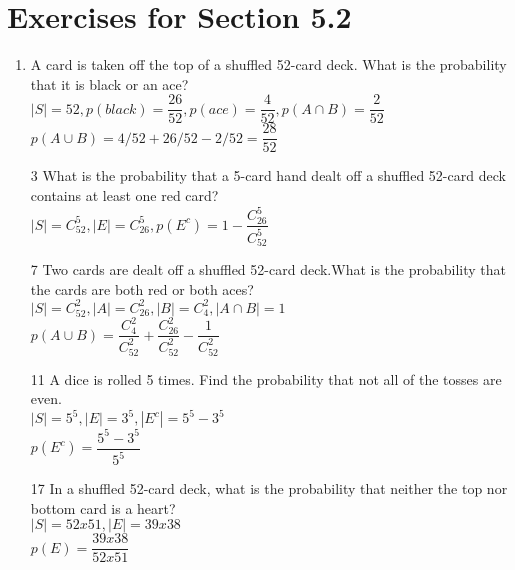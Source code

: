 \documentclass[12pt]{article}
\begin{document}
\section*{Exercises for Section 5.2}
\begin{enumerate}
    \item A card is taken off the top of a shuffled 52-card deck. What is the probability that it is black or an ace?\\
	$|S| = 52, p(black) = \dfrac{26}{52}, p(ace)=\dfrac{4}{52}, p(A\cap B) = \dfrac{2}{52}$\\
	$p(A\cup B) =  4/52 + 26/52 - 2/52 = \dfrac{28}{52}$
    \item [3] What is the probability that a 5-card hand dealt off a shuffled 52-card deck contains at least one red card?\\
	$|S| = C_{52}^5, |E| = C_{26}^{5}, p(E^c) = 1 - \dfrac{C_{26}^5}{C_{52}^5}$
    \item [7] Two cards are dealt off a shuffled 52-card deck.What is the probability that the cards are both red or both aces?\\
	$|S| = C_{52}^2, |A|=C_{26}^2, |B|=C_{4}^2, |A\cap B| = 1$\\
	$p(A\cup B) = \dfrac{C_4^2}{C_{52}^2} + \dfrac{C_{26}^2}{C_{52}^2} - \dfrac{1}{C_{52}^2}$
    \item [11] A dice is rolled 5 times. Find the probability that not all of the tosses are even.\\
	$|S| = 5^5, |E| = 3^5, |E^c| = 5^5 - 3^5$\\
	$p(E^c) = \dfrac{5^5-3^5}{5^5}$
    \item [17] In a shuffled 52-card deck, what is the probability that neither the top nor bottom card is a heart?\\
	$|S| = 52x51, |E| = 39x38$\\
	$p(E)= \dfrac{39x38}{52x51}$
\end{enumerate}
\end{document}
